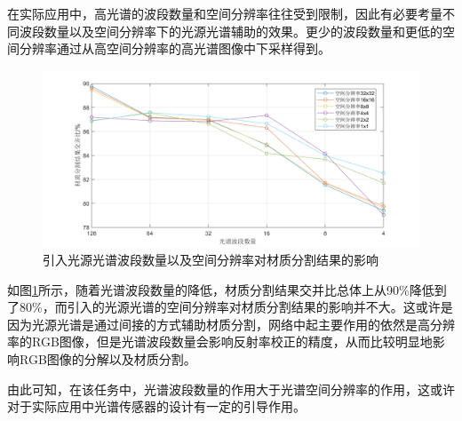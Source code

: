\documentclass[
    type = master, %
    degree = academic,        %
    decl-page,  %
  ]{njuthesis}
\begin{document}
在实际应用中，高光谱的波段数量和空间分辨率往往受到限制，因此有必要考量不同波段数量以及空间分辨率下的光源光谱辅助的效果。更少的波段数量和更低的空间分辨率通过从高空间分辨率的高光谱图像中下采样得到。


\begin{figure}[h]
	\centering
	\includegraphics[width=1.0\linewidth]{docs/fig-chap4/fig-4-result-resolution.pdf}
	\caption{引入光源光谱波段数量以及空间分辨率对材质分割结果的影响}
	\label{fig:seg result resolution}
\end{figure}


如图\ref{fig:seg result resolution}所示，随着光谱波段数量的降低，材质分割结果交并比总体上从90\%降低到了80\%，而引入的光源光谱的空间分辨率对材质分割结果的影响并不大。这或许是因为光源光谱是通过间接的方式辅助材质分割，网络中起主要作用的依然是高分辨率的RGB图像，但是光谱波段数量会影响反射率校正的精度，从而比较明显地影响RGB图像的分解以及材质分割。

由此可知，在该任务中，光谱波段数量的作用大于光谱空间分辨率的作用，这或许对于实际应用中光谱传感器的设计有一定的引导作用。
\end{document}

